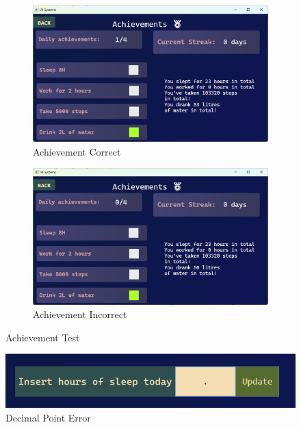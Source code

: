 \documentclass[11pt]{article}
\begin{document}
\begin{figure}[!ht]
  \centering
  \begin{subfigure}{0.4\linewidth}
    \includegraphics[width=\linewidth]{achievementCorrect.png}
    \caption{Achievement Correct}
    \label{fig:ManualTest1.1}
  \end{subfigure}
  \hfill
  \begin{subfigure}{0.4\linewidth}
    \includegraphics[width=\linewidth]{achievementIncorrect.png}
    \caption{Achievement Incorrect}
    \label{fig:ManualTest1.2}
  \end{subfigure}
  \caption{Achievement Test}
  \label{fig:ManualTest1}
\end{figure}


\begin{figure}[!ht]
\centering
    \includegraphics[width=0.8\linewidth]{decimalPointError.png}
\caption{Decimal Point Error}
\label{fig:ManualTest2}
\end{figure}
\end{document}
